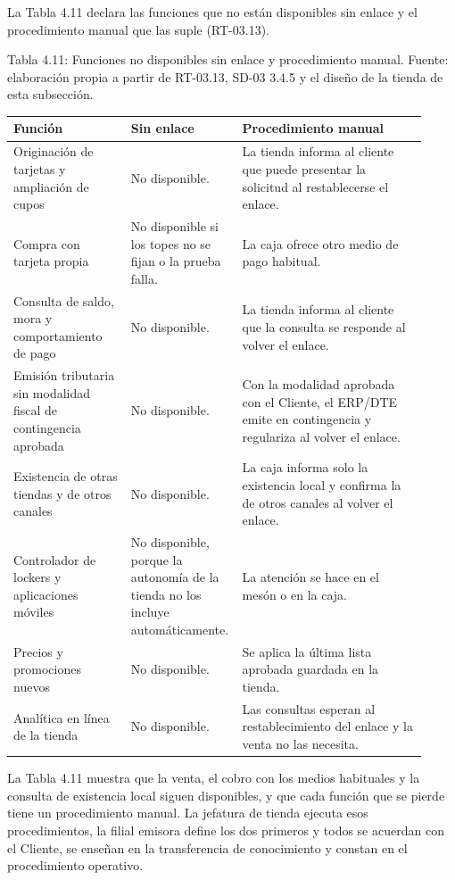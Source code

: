 \documentclass[11pt]{article}
\begin{document}
La Tabla 4.11 declara las funciones que no están disponibles sin enlace y el procedimiento manual que las suple (RT-03.13).

\par\vspace{0pt plus 10\baselineskip}\vspace{0pt plus -10\baselineskip}

Tabla 4.11: Funciones no disponibles sin enlace y procedimiento manual. Fuente: elaboración propia a partir de RT-03.13, SD-03 3.4.5 y el diseño de la tienda de esta subsección.\par\nopagebreak
\begin{longtable}{@{}p{0.28\linewidth}p{0.20\linewidth}p{0.44\linewidth}@{}}
\toprule Función & Sin enlace & Procedimiento manual \\
\midrule\endhead\bottomrule\endlastfoot
Originación de tarjetas y ampliación de cupos & No disponible. & La tienda informa al cliente que puede presentar la solicitud al restablecerse el enlace. \\
Compra con tarjeta propia & No disponible si los topes no se fijan o la prueba falla. & La caja ofrece otro medio de pago habitual. \\
Consulta de saldo, mora y comportamiento de pago & No disponible. & La tienda informa al cliente que la consulta se responde al volver el enlace. \\
Emisión tributaria sin modalidad fiscal de contingencia aprobada & No disponible. & Con la modalidad aprobada con el Cliente, el ERP/DTE emite en contingencia y regulariza al volver el enlace. \\
Existencia de otras tiendas y de otros canales & No disponible. & La caja informa solo la existencia local y confirma la de otros canales al volver el enlace. \\
Controlador de lockers y aplicaciones móviles & No disponible, porque la autonomía de la tienda no los incluye automáticamente. & La atención se hace en el mesón o en la caja. \\
Precios y promociones nuevos & No disponible. & Se aplica la última lista aprobada guardada en la tienda. \\
Analítica en línea de la tienda & No disponible. & Las consultas esperan al restablecimiento del enlace y la venta no las necesita. \\
\end{longtable}

La Tabla 4.11 muestra que la venta, el cobro con los medios habituales y la consulta de existencia local siguen disponibles, y que cada función que se pierde tiene un procedimiento manual. La jefatura de tienda ejecuta esos procedimientos, la filial emisora define los dos primeros y todos se acuerdan con el Cliente, se enseñan en la transferencia de conocimiento y constan en el procedimiento operativo.
\end{document}

